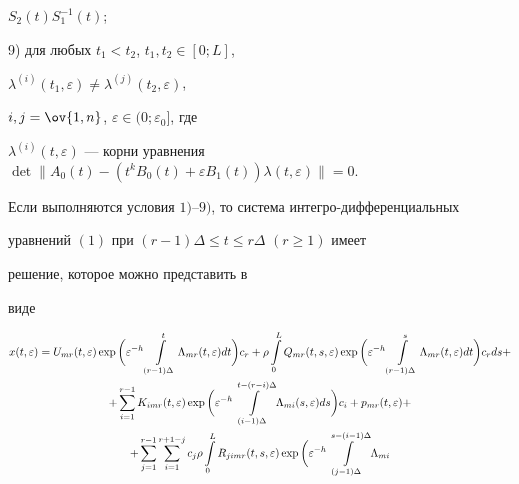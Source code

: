 $S_2(t)S^{-1}_1(t)$; 


 


9) для любых $t_1<t_2$, $t_1,t_2\in[0;L]$, 


$\lambda^{(i)}(t_1,\varepsilon)\ne \lambda^{(j)}(t_2,\varepsilon)$, 


$i,j=\ov{1,n}$, $\varepsilon\in(0;\varepsilon_0]$, где 


$\lambda^{(i)}(t,\varepsilon)$ --- корни уравнения $\det\|A_0(t)-(t^k 


B_0(t)+\varepsilon B_1(t))\lambda(t,\varepsilon)\|=0$. 


 


\begin{thm} 


Если выполняются условия $1)$--$9)$, то система интегро-дифференциальных 


уравнений $(1)$ при $(r-1)\Delta\le t\le r\Delta$ $(r\ge1)$ имеет 


решение, которое можно представить в 


виде 


\begin{gather} 


x(t,\varepsilon)=U_{mr}(t,\varepsilon)\exp\bigg( 


\varepsilon^{-h}\int\limits^t_{(r-1)\Delta}\Lambda_{mr} 


(t,\varepsilon)dt\bigg)c_r+\rho\int\limits^L_0 


Q_{mr}(t,s,\varepsilon)\exp\bigg(\varepsilon^{-h} 


\int\limits^s_{(r-1)\Delta}\Lambda_{mr}(t,\varepsilon) 


dt\bigg)c_r ds+\notag \\ 


% 


+\sum^{r-1}_{i=1}K_{imr}(t,\varepsilon)\exp\bigg( 


\varepsilon^{-h}\int\limits^{t-(r-i)\Delta}_{(i-1)\Delta} 


\Lambda_{mi}(s,\varepsilon)ds\bigg)c_i+p_{mr} 


(t,\varepsilon)+\notag \\ 


% 


+\sum^{r-1}_{j=1}\sum^{r+1-j}_{i=1}c_j\rho\int\limits^L_0 


R_{ji mr}(t,s,\varepsilon)\exp\bigg(\varepsilon^{-h} 


\int\limits^{s-(i-1)\Delta}_{(j-1)\Delta}\Lambda_{mi} 



\end{gather}
\end{thm}
